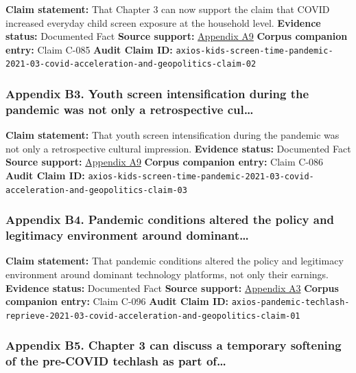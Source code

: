 \documentclass[
  american,
  11pt,
  letterpaper,
]{article}
\begin{document}
\textbf{Claim statement:} That Chapter 3 can now support the claim that
COVID increased everyday child screen exposure at the household level.
\textbf{Evidence status:} Documented Fact \textbf{Source support:}
\hyperref[appendix-a9-kids-screen-time-up-50-during-pandemic]{Appendix
A9} \textbf{Corpus companion entry:} Claim C-085 \textbf{Audit Claim
ID:}
\texttt{axios-kids-screen-time-pandemic-2021-03-covid-acceleration-and-geopolitics-claim-02}

\subsubsection{Appendix B3. Youth screen intensification during the
pandemic was not only a retrospective
cul\ldots{}}\label{appendix-b3-youth-screen-intensification-during-the-pandemic-was-not-only-a-retrospective-cul}

\textbf{Claim statement:} That youth screen intensification during the
pandemic was not only a retrospective cultural impression.
\textbf{Evidence status:} Documented Fact \textbf{Source support:}
\hyperref[appendix-a9-kids-screen-time-up-50-during-pandemic]{Appendix
A9} \textbf{Corpus companion entry:} Claim C-086 \textbf{Audit Claim
ID:}
\texttt{axios-kids-screen-time-pandemic-2021-03-covid-acceleration-and-geopolitics-claim-03}

\subsubsection{Appendix B4. Pandemic conditions altered the policy and
legitimacy environment around
dominant\ldots{}}\label{appendix-b4-pandemic-conditions-altered-the-policy-and-legitimacy-environment-around-dominant}

\textbf{Claim statement:} That pandemic conditions altered the policy
and legitimacy environment around dominant technology platforms, not
only their earnings. \textbf{Evidence status:} Documented Fact
\textbf{Source support:}
\hyperref[appendix-a3-pandemic-provides-a-techlash-reprieve]{Appendix
A3} \textbf{Corpus companion entry:} Claim C-096 \textbf{Audit Claim
ID:}
\texttt{axios-pandemic-techlash-reprieve-2021-03-covid-acceleration-and-geopolitics-claim-01}

\subsubsection{Appendix B5. Chapter 3 can discuss a temporary softening
of the pre-COVID techlash as part
of\ldots{}}\label{appendix-b5-chapter-3-can-discuss-a-temporary-softening-of-the-pre-covid-techlash-as-part-of}
\end{document}
